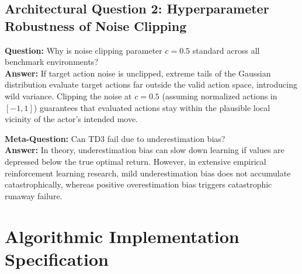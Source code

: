 \documentclass[11pt,a4paper]{article}
\theoremstyle{definition}
\begin{document}
\subsection{Architectural Question 2: Hyperparameter Robustness of Noise Clipping}
\textbf{Question:} Why is noise clipping parameter $c = 0.5$ standard across all benchmark environments?\\
\textbf{Answer:} If target action noise is unclipped, extreme tails of the Gaussian distribution evaluate target actions far outside the valid action space, introducing wild variance. Clipping the noise at $c = 0.5$ (assuming normalized actions in $[-1, 1]$) guarantees that evaluated actions stay within the plausible local vicinity of the actor's intended move.

\textbf{Meta-Question:} Can TD3 fail due to underestimation bias?\\
\textbf{Answer:} In theory, underestimation bias can slow down learning if values are depressed below the true optimal return. However, in extensive empirical reinforcement learning research, mild underestimation bias does not accumulate catastrophically, whereas positive overestimation bias triggers catastrophic runaway failure.

\section{Algorithmic Implementation Specification}
\end{document}
